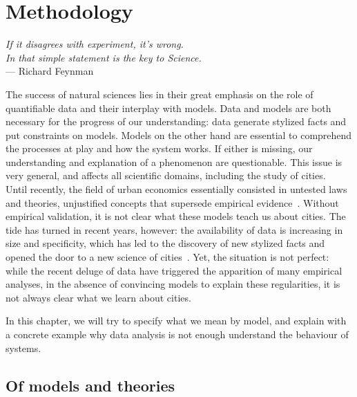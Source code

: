 

\chapter{Methodology}
\label{chap:methodology}

\begin{flushright}{\slshape    
If it disagrees with experiment, it's wrong.\\ 
In that simple statement is the key to Science.} \\ \medskip
--- Richard Feynman~\cite{Feynman:1965}
\end{flushright}


\bigskip

The success of natural sciences lies in their great emphasis on the role of
quantifiable data and their interplay with models. Data and models are both
necessary for the progress of our understanding: data generate stylized facts
and put constraints on models. Models on the other hand are essential to
comprehend the processes at play and how the system works. If either is missing,
our understanding and explanation of a phenomenon are questionable. This issue
is very general, and affects all scientific domains, including the study of
cities.\\

Until recently, the field of urban economics essentially consisted in untested
laws and theories, unjustified concepts that supersede empirical
evidence~\cite{Bouchaud:2008}. Without empirical validation, it is not clear
what these models teach us about cities. The tide has turned in recent years,
however: the availability of data is increasing in size and specificity, which
has led to the discovery of new stylized facts and opened the door to a new
science of cities~\cite{Batty:2013}. Yet, the situation is not perfect: while
the recent deluge of data have triggered the apparition of many empirical
analyses, in the absence of convincing models to explain these regularities, it
is not always clear what we learn about cities.

In this chapter, we will try to specify what we mean by model, and explain with
a concrete example why data analysis is not enough understand the behaviour of
systems.


\section{Of models and theories}

